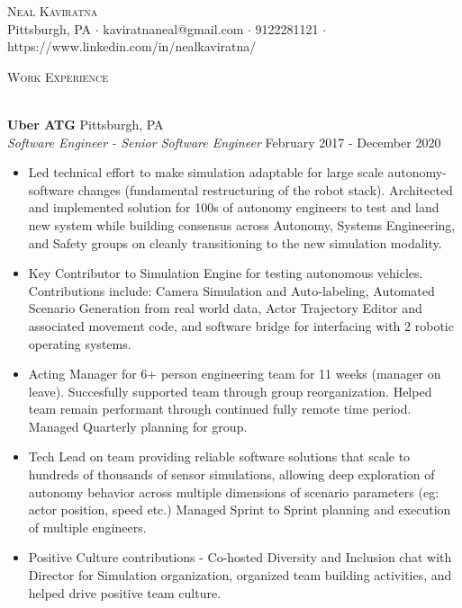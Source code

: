 \documentclass[a4paper]{article}
\newcommand{\lineunder} {
    \vspace*{-8pt} \\
    \hspace*{-18pt} \hrulefill \\
}
\newcommand{\header} [1] {
    {\hspace*{-18pt}\vspace*{6pt} \textsc{#1}}
    \vspace*{-6pt} \lineunder
}
\begin{document}
\vspace*{-40pt}

    

\vspace*{-10pt}
\begin{center}
	{\Huge \scshape {Neal Kaviratna}}\\
	Pittsburgh, PA $\cdot$ kaviratnaneal@gmail.com $\cdot$ 9122281121 $\cdot$ https://www.linkedin.com/in/nealkaviratna/\\
\end{center}

\header{Work Experience}
\vspace{1mm}

\textbf{Uber ATG} \hfill Pittsburgh, PA\\
\textit{Software Engineer - Senior Software Engineer} \hfill February 2017 - December 2020\\
\vspace{-1mm}
\begin{itemize} \itemsep 1pt
	\item Led technical effort to make simulation adaptable for large scale autonomy-software changes (fundamental restructuring of the robot stack). Architected and implemented solution for 100s of autonomy engineers to test and land new system while building consensus across Autonomy, Systems Engineering, and Safety groups on cleanly transitioning to the new simulation modality.
	\item Key Contributor to Simulation Engine for testing autonomous vehicles. Contributions include: Camera Simulation and Auto-labeling, Automated Scenario Generation from real world data, Actor Trajectory Editor and associated movement code, and software bridge for interfacing with 2 robotic operating systems.
	\item Acting Manager for 6+ person engineering team for 11 weeks (manager on leave). Succesfully supported team through group reorganization. Helped team remain performant through continued fully remote time period. Managed Quarterly planning for group.
	\item Tech Lead on team providing reliable software solutions that scale to hundreds of thousands of sensor simulations, allowing deep exploration of autonomy behavior across multiple dimensions of scenario parameters (eg: actor position, speed etc.) Managed Sprint to Sprint planning and execution of multiple engineers.
	\item Positive Culture contributions - Co-hosted Diversity and Inclusion chat with Director for Simulation organization, organized team building activities, and helped drive positive team culture.
\end{itemize}
\end{document}
